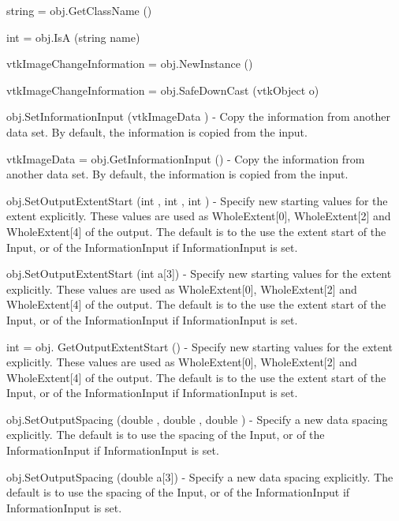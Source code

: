 \begin{DoxyItemize}
\item {\ttfamily string = obj.\-Get\-Class\-Name ()}  
\item {\ttfamily int = obj.\-Is\-A (string name)}  
\item {\ttfamily vtk\-Image\-Change\-Information = obj.\-New\-Instance ()}  
\item {\ttfamily vtk\-Image\-Change\-Information = obj.\-Safe\-Down\-Cast (vtk\-Object o)}  
\item {\ttfamily obj.\-Set\-Information\-Input (vtk\-Image\-Data )} -\/ Copy the information from another data set. By default, the information is copied from the input.  
\item {\ttfamily vtk\-Image\-Data = obj.\-Get\-Information\-Input ()} -\/ Copy the information from another data set. By default, the information is copied from the input.  
\item {\ttfamily obj.\-Set\-Output\-Extent\-Start (int , int , int )} -\/ Specify new starting values for the extent explicitly. These values are used as Whole\-Extent\mbox{[}0\mbox{]}, Whole\-Extent\mbox{[}2\mbox{]} and Whole\-Extent\mbox{[}4\mbox{]} of the output. The default is to the use the extent start of the Input, or of the Information\-Input if Information\-Input is set.  
\item {\ttfamily obj.\-Set\-Output\-Extent\-Start (int a\mbox{[}3\mbox{]})} -\/ Specify new starting values for the extent explicitly. These values are used as Whole\-Extent\mbox{[}0\mbox{]}, Whole\-Extent\mbox{[}2\mbox{]} and Whole\-Extent\mbox{[}4\mbox{]} of the output. The default is to the use the extent start of the Input, or of the Information\-Input if Information\-Input is set.  
\item {\ttfamily int = obj. Get\-Output\-Extent\-Start ()} -\/ Specify new starting values for the extent explicitly. These values are used as Whole\-Extent\mbox{[}0\mbox{]}, Whole\-Extent\mbox{[}2\mbox{]} and Whole\-Extent\mbox{[}4\mbox{]} of the output. The default is to the use the extent start of the Input, or of the Information\-Input if Information\-Input is set.  
\item {\ttfamily obj.\-Set\-Output\-Spacing (double , double , double )} -\/ Specify a new data spacing explicitly. The default is to use the spacing of the Input, or of the Information\-Input if Information\-Input is set.  
\item {\ttfamily obj.\-Set\-Output\-Spacing (double a\mbox{[}3\mbox{]})} -\/ Specify a new data spacing explicitly. The default is to use the spacing of the Input, or of the Information\-Input if Information\-Input is set.  

\end{DoxyItemize}
